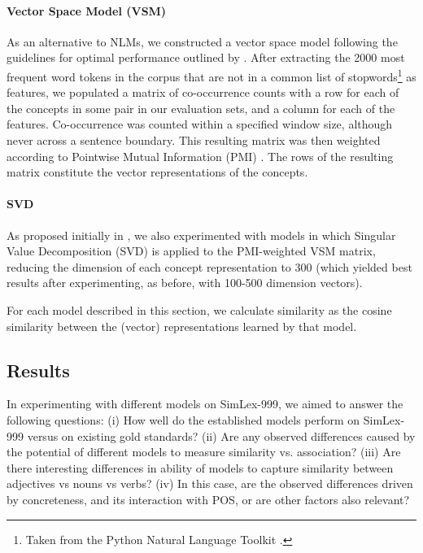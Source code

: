 \documentclass[fullname]{clv2}
\begin{document}
\paragraph{\bf Vector Space Model (VSM)}

As an alternative to NLMs, we constructed a vector space model following the guidelines for optimal performance outlined by . After extracting the 2000 most frequent word tokens in the corpus that are not in a common list of stopwords\footnote{Taken from the Python Natural Language Toolkit \cite{bird2006nltk}.} as features, we populated a matrix of co-occurrence counts with a row for each of the concepts in some pair in our evaluation sets, and a column for each of the features. Co-occurrence was counted within a specified window size, although never across a sentence boundary. This resulting matrix was then weighted according to Pointwise Mutual Information (PMI) \cite{recchia2009more}. The rows of the resulting matrix constitute the vector representations of the concepts.   

\paragraph{\bf SVD} As proposed initially in , we also experimented with models in which Singular Value Decomposition (SVD) \cite{golub1970singular} is applied to the PMI-weighted VSM matrix, reducing the dimension of each concept representation to 300 (which yielded best results after experimenting, as before, with 100-500 dimension vectors). 

\vspace{1\baselineskip}

\noindent 
For each model described in this section, we calculate similarity as the cosine similarity between the (vector) representations learned by that model. 

\subsection{Results}

In experimenting with different models on SimLex-999, we aimed to answer the following questions: (i) How well do the established models perform on SimLex-999 versus on existing gold standards? (ii) Are any observed differences caused by the potential of different models to measure similarity vs. association? (iii) Are there interesting differences in ability of models to capture similarity between adjectives vs nouns vs verbs? (iv) In this case, are the observed differences driven by concreteness, and its interaction with POS, or are other factors also relevant?
\end{document}
